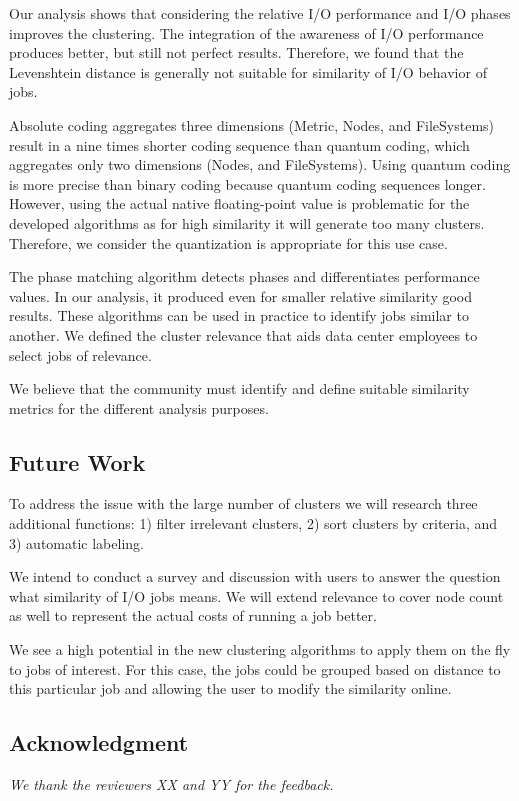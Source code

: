 \documentclass{jhps}
\begin{document}
{{{{Our analysis shows that considering the relative I/O performance and I/O phases improves the clustering.
The integration of the awareness of I/O performance produces better, but still not perfect results.
Therefore, we found that the Levenshtein distance is generally not suitable for similarity of I/O behavior of jobs.

Absolute coding aggregates three dimensions (Metric, Nodes, and FileSystems) result in a nine times shorter coding sequence than quantum coding, which aggregates only two dimensions (Nodes, and FileSystems).
Using quantum coding is more precise than binary coding because quantum coding sequences longer.
However, using the actual native floating-point value is problematic for the developed algorithms as for high similarity it will generate too many clusters.
Therefore, we consider the quantization is appropriate for this use case.

The phase matching algorithm detects phases and differentiates performance values.
In our analysis, it produced even for smaller relative similarity good results.
These algorithms can be used in practice to identify jobs similar to another.
We defined the cluster relevance that aids data center employees to select jobs of relevance.

We believe that the community must identify and define suitable similarity metrics for the different analysis purposes.


\subsection{Future Work}
To address the issue with the large number of clusters we will research three additional functions: 1) filter irrelevant clusters, 2) sort clusters by criteria, and 3) automatic labeling.

We intend to conduct a survey and discussion with users to answer the question what similarity of I/O jobs means.
We will extend relevance to cover node count as well to represent the actual costs of running a job better.

We see a high potential in the new clustering algorithms to apply them on the fly to jobs of interest.
For this case, the jobs could be grouped based on distance to this particular job and allowing the user to modify the similarity online.


\subsection*{Acknowledgment} %
\textit{We thank the reviewers XX and YY for the feedback.}

}}}}
\end{document}
